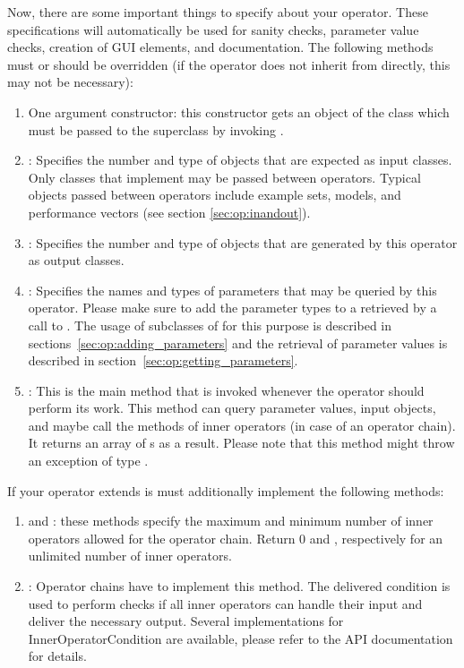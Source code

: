 Now, there are some important things to specify about your operator.
These specifications will automatically be used for sanity checks, parameter
value checks, creation of GUI elements, and documentation. The following
methods must or should be overridden (if the operator does not inherit from
 directly, this may not be necessary):
\begin{enumerate}
\item One argument constructor: this constructor gets an object of the class 
   which must be passed to the superclass by
  invoking .
\item {}: Specifies the number and type of
  objects that are expected as input classes. Only classes that implement
   may be passed between
  operators. Typical objects passed between operators include example sets,
  models, and performance vectors (see section \ref{sec:op:inandout}).
\item {}: Specifies the number and type of
  objects that are generated by this operator as output classes.
\item {}: Specifies the names and types
  of parameters that may be queried by this operator. Please make sure
  to add the parameter types to a  retrieved by a
  call to . The usage of subclasses of
   for this purpose is described in
  sections~\ref{sec:op:adding_parameters} and the retrieval of
  parameter values is described in section~\ref{sec:op:getting_parameters}.
\item {}: This is the main method that is
  invoked whenever the operator should perform its work. This method
  can query parameter values, input objects, and maybe call the
   methods of inner operators (in case of an operator chain). It
  returns an array of s as a result.
  Please note that this method might throw an exception of type
  .
\end{enumerate}

If your operator extends  is must additionally implement
the following methods:
\begin{enumerate}
\item {} and
  : these methods specify
  the maximum and minimum number of inner operators allowed for the operator
  chain. Return 0 and , respectively for an unlimited
  number of inner operators.
\item {}: Operator
  chains have to implement this method. The delivered condition is used to
  perform checks if all inner operators can handle their input and deliver the
  necessary output. Several implementations for InnerOperatorCondition are
  available, please refer to the API documentation for details.
\end{enumerate}


